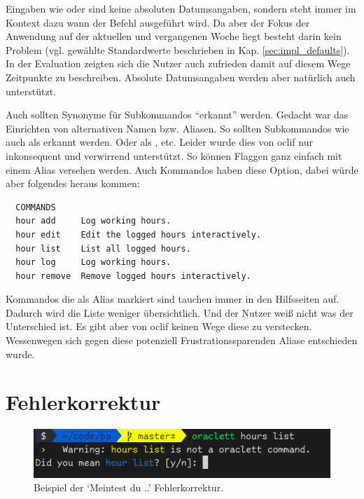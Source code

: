 \documentclass[oneside,bibliography=totocnumbered,BCOR=5mm]{scrbook}
\newenvironment{code}{\captionsetup{type=listing, skip=0pt}}{}
\begin{document}
Eingaben wie  oder  sind
keine absoluten Datumsangaben, sondern steht immer im Kontext dazu wann der
Befehl ausgeführt wird. Da aber der Fokus der Anwendung auf der aktuellen und
vergangenen Woche liegt besteht darin kein Problem (vgl. gewählte Standardwerte
beschrieben in Kap. \ref{sec:impl_defaults}). In der Evaluation zeigten sich die
Nutzer auch zufrieden damit auf diesem Wege Zeitpunkte zu beschreiben. Absolute
Datumsangaben werden aber natürlich auch unterstützt.

\medskip

Auch sollten Synonyme für Subkommandos ``erkannt'' werden. Gedacht war das
Einrichten von alternativen Namen bzw. Aliasen. So sollten Subkommandos
wie  auch als  erkannt werden. Oder
 als , etc. Leider wurde dies von oclif
nur inkonsequent und verwirrend unterstützt. So können Flaggen ganz einfach mit
einem Alias versehen werden. Auch Kommandos haben diese Option, dabei würde aber
folgendes heraus kommen:

\begin{code}
  \medskip
  \begin{verbatim}
  COMMANDS
  hour add     Log working hours.
  hour edit    Edit the logged hours interactively.
  hour list    List all logged hours.
  hour log     Log working hours.
  hour remove  Remove logged hours interactively.
  \end{verbatim}
\end{code}

Kommandos die als Alias markiert sind tauchen immer in den Hilfsseiten auf.
Dadurch wird die Liste weniger übersichtlich. Und der Nutzer weiß nicht was
der Unterschied ist. Es gibt aber von oclif keinen Wege diese zu verstecken.
Wessenwegen sich gegen diese potenziell Frustrationssparenden Aliase entschieden
wurde.

\section{Fehlerkorrektur}

\begin{figure}
  \centering
  \includegraphics[scale=0.5]{did-you-mean.png}
  \caption{Beispiel der `Meintest du ..' Fehlerkorrektur.}
  \label{fig:did-you-mean}
\end{figure}
\end{document}
